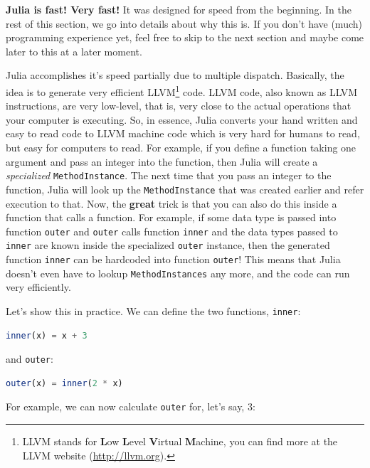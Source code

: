 \documentclass[
  notoc %
]{tufte-book}
\newcommand{\passthrough}[1]{#1}
\begin{document}
\textbf{Julia is fast! Very fast!} It was designed for speed from the
beginning. In the rest of this section, we go into details about why
this is. If you don't have (much) programming experience yet, feel free
to skip to the next section and maybe come later to this at a later
moment.

Julia accomplishes it's speed partially due to multiple dispatch.
Basically, the idea is to generate very efficient LLVM\footnote{LLVM
  stands for \textbf{L}ow \textbf{L}evel \textbf{V}irtual
  \textbf{M}achine, you can find more at the LLVM website
  (\url{http://llvm.org}).} code. LLVM code, also known as LLVM
instructions, are very low-level, that is, very close to the actual
operations that your computer is executing. So, in essence, Julia
converts your hand written and easy to read code to LLVM machine code
which is very hard for humans to read, but easy for computers to read.
For example, if you define a function taking one argument and pass an
integer into the function, then Julia will create a \emph{specialized}
\passthrough{\lstinline!MethodInstance!}. The next time that you pass an
integer to the function, Julia will look up the
\passthrough{\lstinline!MethodInstance!} that was created earlier and
refer execution to that. Now, the \textbf{great} trick is that you can
also do this inside a function that calls a function. For example, if
some data type is passed into function \passthrough{\lstinline!outer!}
and \passthrough{\lstinline!outer!} calls function
\passthrough{\lstinline!inner!} and the data types passed to
\passthrough{\lstinline!inner!} are known inside the specialized
\passthrough{\lstinline!outer!} instance, then the generated function
\passthrough{\lstinline!inner!} can be hardcoded into function
\passthrough{\lstinline!outer!}! This means that Julia doesn't even have
to lookup \passthrough{\lstinline!MethodInstances!} any more, and the
code can run very efficiently.

Let's show this in practice. We can define the two functions,
\passthrough{\lstinline!inner!}:

\begin{lstlisting}[language=Julia]
inner(x) = x + 3
\end{lstlisting}

and \passthrough{\lstinline!outer!}:

\begin{lstlisting}[language=Julia]
outer(x) = inner(2 * x)
\end{lstlisting}

For example, we can now calculate \passthrough{\lstinline!outer!} for,
let's say, 3:
\end{document}
